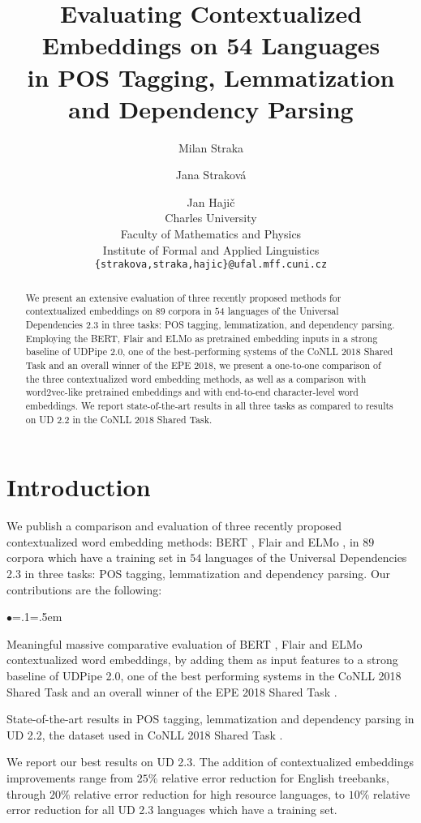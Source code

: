 \documentclass[11pt,a4paper]{article}
\title{Evaluating Contextualized Embeddings on 54 Languages\\
in POS Tagging, Lemmatization and Dependency Parsing}
\author{Milan Straka \and Jana Strakov\'{a} \and Jan Haji\v{c}\\
  Charles University \\
  Faculty of Mathematics and Physics \\
  Institute of Formal and Applied Linguistics \\
  {\tt \{strakova,straka,hajic\}@ufal.mff.cuni.cz} \\}
\date{}
\newenvironment{citemize}{\begin{list}{$\bullet$}{\topsep=.1\smallskipamount\itemsep=0pt\parsep=1pt\labelwidth=.5em}}{\end{list}}
\begin{document}
\maketitle

\begin{abstract}
  We present an extensive evaluation of three recently proposed methods for
  contextualized embeddings on $89$ corpora in $54$ languages of the Universal
  Dependencies 2.3 in three tasks: POS tagging, lemmatization, and dependency
  parsing. Employing the BERT, Flair and ELMo as pretrained embedding inputs in
  a strong baseline of UDPipe 2.0, one of the best-performing systems of the
  CoNLL 2018 Shared Task and an overall winner of the EPE 2018, we present
  a one-to-one comparison of the three contextualized word embedding methods,
  as well as a comparison with word2vec-like pretrained embeddings and with
  end-to-end character-level word embeddings. We report state-of-the-art
  results in all three tasks as compared to results on UD 2.2 in the CoNLL 2018
  Shared Task.
\end{abstract}

\section{Introduction}
\label{section:introduction}

We publish a comparison and evaluation of three recently proposed
contextualized word embedding methods: BERT \cite{BERT}, Flair \cite{Akbik} and
ELMo \cite{Peters2018}, in $89$ corpora which have a training set in $54$
languages of the Universal Dependencies 2.3 in three tasks: POS tagging,
lemmatization and dependency parsing.
Our contributions are the following:
\begin{citemize}
  \item Meaningful massive comparative evaluation of BERT
    \cite{BERT}, Flair \cite{Akbik} and ELMo \cite{Peters2018} contextualized
    word embeddings, by adding them as input features to a strong baseline of
    UDPipe 2.0, one of the best performing systems in the CoNLL 2018 Shared
    Task \cite{CoNLL2018} and an overall winner of the EPE 2018 Shared Task
    \cite{EPE2018}.
  \item State-of-the-art results in POS tagging, lemmatization and dependency
    parsing in UD 2.2, the dataset used in CoNLL 2018 Shared Task
    \cite{CoNLL2018}.
  \item We report our best results on UD 2.3. The addition of contextualized
    embeddings improvements range from $25\%$ relative error reduction for
    English treebanks, through $20\%$ relative error reduction for high
    resource languages, to $10\%$ relative error reduction for all UD 2.3
    languages which have a training set.
\end{citemize}
\end{document}
